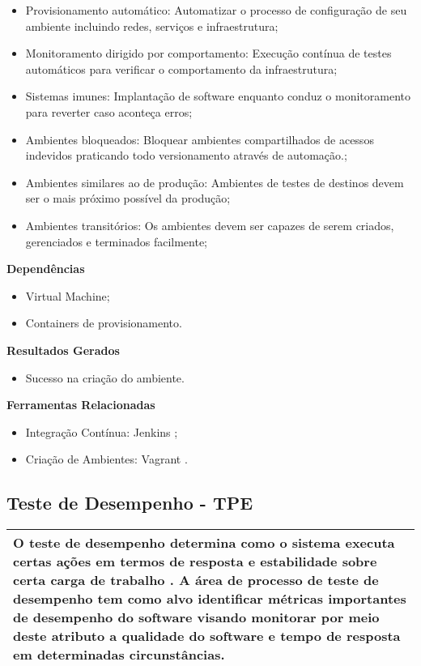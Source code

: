 \begin{itemize}
    \item Provisionamento automático: Automatizar o processo de configuração de seu ambiente incluindo redes, serviços e infraestrutura;
    \item Monitoramento dirigido por comportamento: Execução contínua de testes automáticos para verificar o comportamento da infraestrutura;
    \item Sistemas imunes: Implantação de software enquanto conduz o monitoramento para reverter caso aconteça erros;
    \item Ambientes bloqueados: Bloquear ambientes compartilhados de acessos indevidos praticando todo versionamento através de automação.;
    \item Ambientes similares ao de produção: Ambientes de testes de destinos devem ser o mais próximo possível da produção;
    \item Ambientes transitórios: Os ambientes devem ser capazes de serem criados, gerenciados e terminados facilmente;
\end{itemize}

\textbf{Dependências}
\begin{itemize}
    \item Virtual Machine;
    \item Containers de provisionamento.
\end{itemize}

\textbf{ Resultados Gerados}
\begin{itemize}
    \item Sucesso na criação do ambiente.
\end{itemize}

\textbf{Ferramentas Relacionadas}
\begin{itemize}
    \item Integração Contínua: Jenkins \cite{Jenkins};
    \item Criação de Ambientes:  Vagrant \cite{Vagrant}.
\end{itemize}


\subsection{Teste de Desempenho - TPE}
\label{sec:tpe}

\begin{table}[!ht]
\centering
\begin{tabular}{|p{130mm}|}
\hline
O teste de desempenho determina como o sistema executa certas ações em termos de resposta e estabilidade sobre certa carga de trabalho \cite{Molyneaux2009}. A área de processo de teste de desempenho tem como alvo identificar métricas importantes de desempenho do software visando monitorar por meio deste atributo a qualidade do software e tempo de resposta em determinadas circunstâncias.\\
\hline
\end{tabular}
\end{table}

